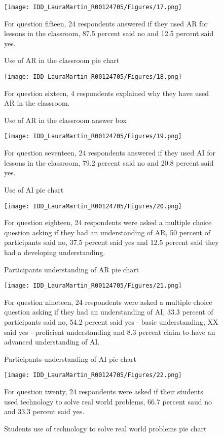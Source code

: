 \begin{figure}[ht]
\centering
\texttt{[image: IDD\_LauraMartin\_R00124705/Figures/17.png]}
\caption{Use of AR in the classroom pie chart}
{For question fifteen, 24 respondents answered if they used AR for lessons in the classroom, 87.5 percent said no and 12.5 percent said yes.}
\end{figure}

\begin{figure}[ht]
\centering
\texttt{[image: IDD\_LauraMartin\_R00124705/Figures/18.png]}
\caption{Use of AR in the classroom answer box}
{For question sixteen, 4 respondents explained why they have used AR in the classroom.}

\end{figure}

\begin{figure}[ht]
\centering
\texttt{[image: IDD\_LauraMartin\_R00124705/Figures/19.png]}
\caption{Use of AI pie chart}
{For question seventeen, 24 respondents answered if they used AI for lessons in the classroom, 79.2 percent said no and 20.8 percent said yes.}
\end{figure}

\begin{figure}[ht]
\centering
\texttt{[image: IDD\_LauraMartin\_R00124705/Figures/20.png]}
\caption{Participants understanding of AR pie chart}
{For question eighteen, 24 respondents were asked a multiple choice question asking if they had an understanding of AR, 50 percent of participants said no, 37.5 percent said yes and 12.5 percent said they had a developing understanding.}
\end{figure}

\begin{figure}[ht]
\centering
\texttt{[image: IDD\_LauraMartin\_R00124705/Figures/21.png]}
\caption{Participants understanding of AI pie chart}
{For question nineteen, 24 respondents were asked a multiple choice question asking if they had an understanding of AI, 33.3 percent of participants said no, 54.2 percent said yes - basic understanding, XX said yes - proficient understanding and 8.3 percent claim to have an advanced understanding of AI.}
\end{figure}

\begin{figure}[ht]
\centering
\texttt{[image: IDD\_LauraMartin\_R00124705/Figures/22.png]}
\caption{Students use of technology to solve real world problems pie chart}
{For question twenty, 24 respondents were asked if their students used technology to solve real world problems, 66.7 percent saud no and 33.3 percent said yes.}
\end{figure}

